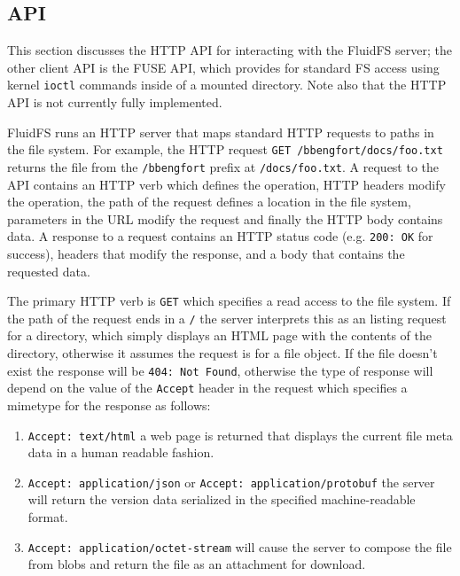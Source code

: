 \documentclass[letterpaper,twocolumn,10pt]{article}
\begin{document}
\subsection*{API}

This section discusses the HTTP API for interacting with the FluidFS server;
the other client API is the FUSE API, which provides for standard FS access
using kernel \texttt{ioctl} commands inside of a mounted directory.
Note also that the HTTP API is not currently fully implemented.

FluidFS runs an HTTP server that maps standard HTTP requests to paths in the
file system.
For example, the HTTP request \texttt{GET /bbengfort/docs/foo.txt} returns
the file from the \texttt{/bbengfort} prefix at \texttt{/docs/foo.txt}.
A request to the API contains an HTTP verb which defines the operation,
HTTP headers modify the operation, the path of the request defines a location
in the file system, parameters in the URL modify the request and finally the
HTTP body contains data.
A response to a request contains an HTTP status code (e.g. \texttt{200: OK}
for success), headers that modify the response, and a body that contains the
requested data.

The primary HTTP verb is \texttt{GET} which specifies a read access to the
file system.
If the path of the request ends in a \texttt{/} the server interprets this as
an listing request for a directory, which simply displays an HTML page with
the contents of the directory, otherwise it assumes the request is for a file
object.
If the file doesn't exist the response will be \texttt{404: Not Found},
otherwise the type of response will depend on the value of the \texttt{Accept}
header in the request which specifies a mimetype for the response as follows:

\begin{enumerate}
    \item \texttt{Accept: text/html} a web page is returned that
    displays the current file meta data in a human readable fashion.
    \item \texttt{Accept: application/json} or \texttt{Accept:
    application/protobuf} the server will return the version data serialized
    in the specified machine-readable format.
    \item \texttt{Accept: application/octet-stream} will cause the server to
    compose the file from blobs and return the file as an attachment for
    download.
\end{enumerate}
\end{document}
